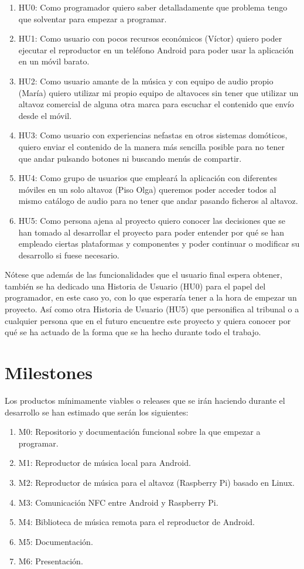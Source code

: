 \begin{enumerate}
    \item HU0: Como programador quiero saber detalladamente que problema tengo
    que solventar para empezar a programar.
    \item HU1: Como usuario con pocos recursos económicos (Víctor) quiero poder
    ejecutar el reproductor en un teléfono Android para poder usar la aplicación
    en un móvil barato.
    \item HU2: Como usuario amante de la música y con equipo de audio propio
    (María) quiero utilizar mi propio equipo de altavoces sin tener que utilizar
    un altavoz comercial de alguna otra marca para escuchar el contenido que
    envío desde el móvil.
    \item HU3: Como usuario con experiencias nefastas en otros sistemas
    domóticos, quiero enviar el contenido de la manera más sencilla posible para
    no tener que andar pulsando botones ni buscando menús de compartir.
    \item HU4: Como grupo de usuarios que empleará la aplicación con diferentes
    móviles en un solo altavoz (Piso Olga) queremos poder acceder todos al mismo
    catálogo de audio para no tener que andar pasando ficheros al altavoz.
    \item HU5: Como persona ajena al proyecto quiero conocer las decisiones que
    se han tomado al desarrollar el proyecto para poder entender por qué se han
    empleado ciertas plataformas y componentes y poder continuar o modificar su
    desarrollo si fuese necesario.
\end{enumerate}

Nótese que además de las funcionalidades que el usuario final espera obtener,
también se ha dedicado una Historia de Usuario (HU0) para el papel del
programador, en este caso yo, con lo que esperaría tener a la hora de empezar un
proyecto. Así como otra Historia de Usuario (HU5) que personifica al tribunal o
a cualquier persona que en el futuro encuentre este proyecto y quiera conocer
por qué se ha actuado de la forma que se ha hecho durante todo el trabajo.

\section{Milestones}
Los productos mínimamente viables o releases que se irán haciendo durante el
desarrollo se han estimado que serán los siguientes:

\begin{enumerate}
    \item M0: Repositorio y documentación funcional sobre la que empezar a programar.
    \item M1: Reproductor de música local para Android.
    \item M2: Reproductor de música para el altavoz (Raspberry Pi) basado en Linux.
    \item M3: Comunicación NFC entre Android y Raspberry Pi.
    \item M4: Biblioteca de música remota para el reproductor de Android.
    \item M5: Documentación.
    \item M6: Presentación.
\end{enumerate}